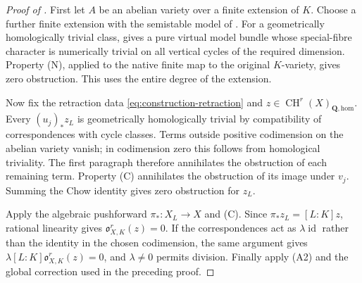 \documentclass[11pt]{article}
\theoremstyle{definition}
\theoremstyle{remark}
\numberwithin{equation}{section}
\newcommand{\CH}{\operatorname{CH}}
\newcommand{\Ob}{\mathfrak o}
\newcommand{\id}{\operatorname{id}}
\newcommand{\homol}{\mathrm{hom}}
\begin{document}
\begin{proof}[Proof of ]
First let $A$ be an abelian variety over a finite extension of $K$. Choose a further finite extension with the semistable model of . For a geometrically homologically trivial class,  gives a pure virtual model bundle whose special-fibre character is numerically trivial on all vertical cycles of the required dimension. Property (N), applied to the native finite map to the original $K$-variety, gives zero obstruction. This uses the entire degree of the extension.

Now fix the retraction data \eqref{eq:construction-retraction} and $z\in\CH^r(X)_{\mathbf Q,\homol}$. Every $(u_j)_*z_L$ is geometrically homologically trivial by compatibility of correspondences with cycle classes. Terms outside positive codimension on the abelian variety vanish; in codimension zero this follows from homological triviality. The first paragraph therefore annihilates the obstruction of each remaining term. Property (C) annihilates the obstruction of its image under $v_j$. Summing the Chow identity gives zero obstruction for $z_L$.

Apply the algebraic pushforward $\pi_*:X_L\to X$ and (C). Since $\pi_*z_L=[L:K]z$, rational linearity gives $\Ob^r_{X,K}(z)=0$. If the correspondences act as $\lambda\id$ rather than the identity in the chosen codimension, the same argument gives $\lambda[L:K]\Ob^r_{X,K}(z)=0$, and $\lambda\ne0$ permits division. Finally apply (A2) and the global correction used in the preceding proof.
\end{proof}
\end{document}
